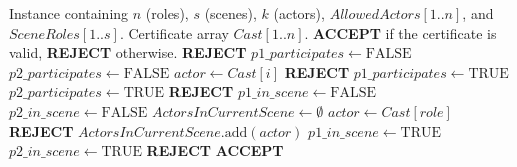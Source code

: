 \documentclass{article}
\begin{document}
\begin{algorithm}
\caption{VerifyCasting(Instance, Certificate)}
\begin{algorithmic}[1]
\Require Instance containing $n$ (roles), $s$ (scenes), $k$ (actors), $AllowedActors[1..n]$, and $SceneRoles[1..s]$.
\Require Certificate array $Cast[1..n]$.
\Ensure \textbf{ACCEPT} if the certificate is valid, \textbf{REJECT} otherwise.
\Statex
{}
    \State \Return \textbf{REJECT}
\EndIf
\Statex
\State $p1\_participates \gets \text{FALSE}$
\State $p2\_participates \gets \text{FALSE}$
\Statex
{}
    \State $actor \gets Cast[i]$
        \State \Return \textbf{REJECT}
    \EndIf
        \State $p1\_participates \gets \text{TRUE}$ 
    \EndIf
        \State $p2\_participates \gets \text{TRUE}$ 
    \EndIf
\EndFor
\Statex
{}
    \State \Return \textbf{REJECT}
\EndIf
\Statex
{}
    \State $p1\_in\_scene \gets \text{FALSE}$
    \State $p2\_in\_scene \gets \text{FALSE}$
    \State $ActorsInCurrentScene \gets \emptyset$
    \Statex
        \State $actor \gets Cast[role]$
            \State \Return \textbf{REJECT} 
        \EndIf
        \State $ActorsInCurrentScene.\text{add}(actor)$
        \Statex
            \State $p1\_in\_scene \gets \text{TRUE}$ 
        \EndIf
            \State $p2\_in\_scene \gets \text{TRUE}$ 
        \EndIf
    \EndFor
    \Statex
        \State \Return \textbf{REJECT} 
    \EndIf
\EndFor
\Statex
\State \Return \textbf{ACCEPT}
\end{algorithmic}
\end{algorithm}
\end{document}
